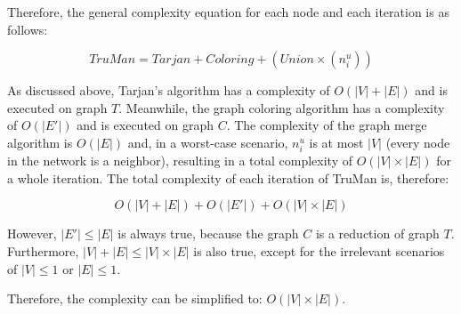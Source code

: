 Therefore, the general complexity equation for each node and each iteration is as follows:

$$ TruMan = Tarjan + Coloring + (Union\times(n^u_i)) $$

As discussed above, Tarjan's algorithm has a complexity of $O(|V|+|E|)$ and is executed on graph $T$.
Meanwhile, the graph coloring algorithm has a complexity of $O(|E'|)$ and is executed on graph $C$.
The complexity of the graph merge algorithm is $O(|E|)$ and, in a worst-case scenario, $n^u_i$ is at most $|V|$ (every node in the network is a neighbor), resulting in a total complexity of $O(|V|\times |E|)$ for a whole iteration.
The total complexity of each iteration of TruMan is, therefore:

$$ O(|V|+|E|) + O(|E'|) + O(|V|\times |E|)$$

However, $|E'| \leq |E|$ is always true, because the graph $C$ is a reduction of graph $T$.
Furthermore, $|V|+|E| \leq |V|\times |E|$ is also true, except for the irrelevant scenarios of $|V| \leq 1$ or $|E| \leq 1$.

Therefore, the complexity can be simplified to: $O(|V| \times |E|)$.


